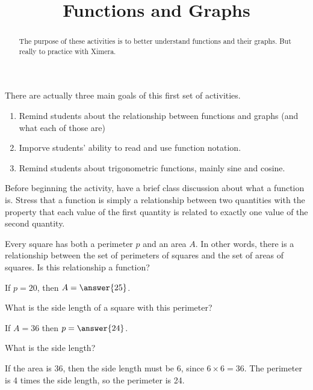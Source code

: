 \documentclass{ximera}
\title{Functions and Graphs}
\begin{document}
\begin{abstract}
The purpose of these activities is to better understand functions and their graphs.  But really to practice with Ximera.
\end{abstract}
\maketitle



\begin{instnote}
There are actually three main goals of this first set of activities.

\begin{enumerate}
\item Remind students about the relationship between functions and graphs (and what each of those are)
\item Imporve students' ability to read and use function notation.
\item Remind students about trigonometric functions, mainly sine and cosine.
\end{enumerate}

Before beginning the activity, have a brief class discussion about what a function is.  Stress that a function is simply a relationship between two quantities with the property that each value of the first quantity is related to exactly one value of the second quantity.

\end{instnote}


Every square has both a perimeter $p$ and an area $A$.  In other words, there is a relationship between the set of perimeters of squares and the set of areas of squares.  Is this relationship a function?

\begin{exercise}
If $p = 20$, then $A = \answer{25}$.
\begin{hint}
What is the side length of a square with this perimeter?
\end{hint}
\end{exercise}

\begin{exercise}
If $A = 36$ then $p = \answer{24}$.
\begin{hint}
What is the side length?
\end{hint}

\begin{solution}
If the area is 36, then the side length must be 6, since $6\times 6 = 36$.  The perimeter is 4 times the side length, so the perimeter is 24.
\end{solution}
\end{exercise}
\end{document}
